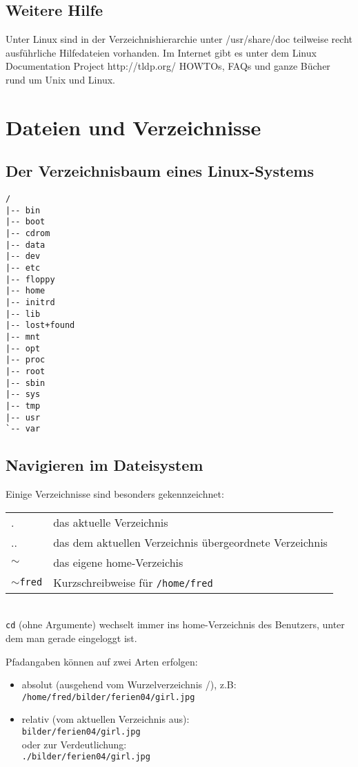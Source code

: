 \documentclass[11pt]{article}
\begin{document}
\subsection{Weitere Hilfe}
Unter Linux sind in der Verzeichnishierarchie unter /usr/share/doc
teilweise recht ausführliche Hilfedateien vorhanden. Im Internet gibt es
unter dem Linux Documentation Project http://tldp.org/ HOWTOs, FAQs und
ganze Bücher rund um Unix und Linux.


\section{Dateien und Verzeichnisse}
\subsection{Der Verzeichnisbaum eines Linux-Systems}
\begin{samepage}
\begin{verbatim}
/
|-- bin
|-- boot
|-- cdrom
|-- data
|-- dev
|-- etc
|-- floppy
|-- home
|-- initrd
|-- lib
|-- lost+found
|-- mnt
|-- opt
|-- proc
|-- root
|-- sbin
|-- sys
|-- tmp
|-- usr
`-- var

\end{verbatim}
\end{samepage}

\subsection{Navigieren im Dateisystem}
Einige Verzeichnisse sind besonders gekennzeichnet:\\

\begin{tabular}{ll}
. & das aktuelle Verzeichnis \\
.. & das dem aktuellen Verzeichnis übergeordnete Verzeichnis \\
$\sim$ & das eigene home-Verzeichis \\
$\sim$\texttt{fred} & Kurzschreibweise für \texttt{/home/fred} \\
\end{tabular} \\

\texttt{cd} (ohne Argumente) wechselt immer ins home-Verzeichnis des
Benutzers, unter dem man gerade eingeloggt ist.

Pfadangaben können auf zwei Arten erfolgen:
\begin{itemize}
\item absolut (ausgehend vom Wurzelverzeichnis /), z.B: \\
\texttt{/home/fred/bilder/ferien04/girl.jpg}
\item relativ (vom aktuellen Verzeichnis aus):\\
\texttt{bilder/ferien04/girl.jpg}\\
oder zur Verdeutlichung:\\
\texttt{./bilder/ferien04/girl.jpg}
\end{itemize}
\end{document}
